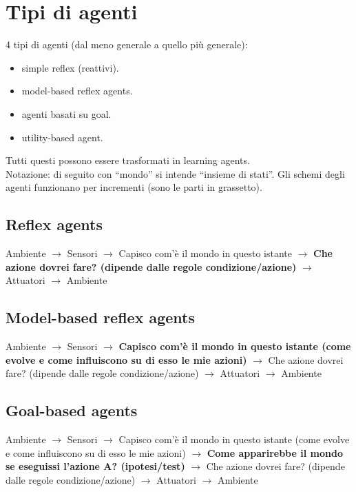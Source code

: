 \newpage

\section{Tipi di agenti}

4 tipi di agenti (dal meno generale a quello più generale):

\begin{itemize}
 \item simple reflex (reattivi).
 \item model-based reflex agents.
 \item agenti basati su goal.
 \item utility-based agent.
\end{itemize}

Tutti questi possono essere trasformati in learning agents.\\

Notazione: di seguito con ``mondo'' si intende ``insieme di stati''. Gli schemi degli agenti funzionano per incrementi (sono le parti in grassetto).

\subsection{Reflex agents}

Ambiente $\rightarrow$ Sensori $\rightarrow$ Capisco com'è il mondo in questo
istante $\rightarrow$ \textbf{Che azione dovrei fare? (dipende dalle regole
condizione/azione)} $\rightarrow$ Attuatori $\rightarrow$ Ambiente

\subsection{Model-based reflex agents}

Ambiente $\rightarrow$ Sensori $\rightarrow$ \textbf{Capisco com'è il mondo in questo istante (come evolve e come influiscono su di esso le mie azioni)} $\rightarrow$ Che azione dovrei fare? (dipende dalle regole condizione/azione) $\rightarrow$ Attuatori $\rightarrow$ Ambiente

\subsection{Goal-based agents}

Ambiente $\rightarrow$ Sensori $\rightarrow$ Capisco com'è il mondo in questo istante (come evolve e come influiscono su di esso le mie azioni) $\rightarrow$ \textbf{Come apparirebbe il mondo se eseguissi l'azione A? (ipotesi/test)} $\rightarrow$ Che azione dovrei fare? (dipende dalle regole condizione/azione) $\rightarrow$ Attuatori $\rightarrow$ Ambiente

